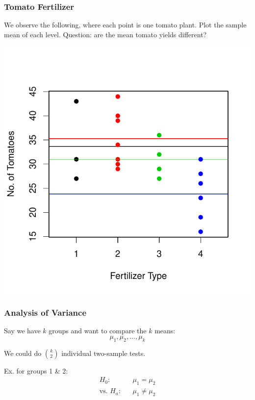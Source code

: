 \documentclass[handout]{beamer}
\newcommand{\blue}[1]{\textcolor{blue2}{#1}}
\begin{document}
\addtocounter{framenumber}{-1}
\begin{frame}
\frametitle{Tomato Fertilizer}
We observe the following, where each point is one tomato plant.  Plot the sample mean of each level. \blue{Question:  are the mean tomato yields different?}
\begin{center}
\includegraphics{figure/lec22-004}
\end{center}
\end{frame}


\begin{frame}
\frametitle{Analysis of Variance}
%
%

Say we have $k$ groups and want to compare the $k$ means:
\[
\mu_1, \mu_2, \ldots, \mu_k
\]

\pause \vspace{0.25cm}

We could do ${k \choose 2}$ individual two-sample tests.\\
\pause \vspace{0.25cm}

Ex. for groups 1 \& 2:
\begin{eqnarray*}
H_0: && \mu_1 = \mu_2\\
\mbox{vs. } H_a:  && \mu_1 \neq \mu_2
\end{eqnarray*}
\end{frame}
\end{document}
